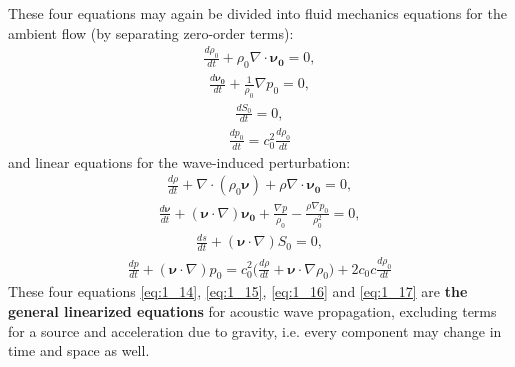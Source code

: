         These four equations may again be divided into fluid mechanics equations for the ambient flow (by separating zero-order terms):
        \begin{align} \label{eq:1_10}
            \frac{d\rho_0}{d t}+\rho_0\nabla\cdot\bm{\nu_0}=0,
        \end{align}
\vspace*{-7mm}
        \begin{align} \label{eq:1_11}
            \frac{d\bm{\nu_0}}{d t}+\frac{1}{\rho_0}\nabla p_0=0,
        \end{align}
\vspace*{-7mm}
        \begin{align} \label{eq:1_12}
            \frac{d S_0}{d t}=0,
        \end{align}
\vspace*{-7mm}
        \begin{align} \label{eq:1_13}
            \frac{d p_0}{d t}=c_0^2\frac{d \rho_0}{d t}
        \end{align}
        and linear equations for the wave-induced perturbation:
        \begin{align} \label{eq:1_14}
            \frac{d \rho}{d t} + \nabla\cdot(\rho_0 \bm{\nu})+\rho\nabla\cdot\bm{\nu_0} = 0,
        \end{align}
\vspace*{-7mm}
        \begin{align} \label{eq:1_15}
            \frac{d \bm{\nu}}{d t} + (\bm{\nu}\cdot\nabla)\bm{\nu_0} + \frac{\nabla p}{\rho_0} - \frac{\rho\nabla p_0}{\rho_0^2}=0,
        \end{align}
\vspace*{-7mm}
        \begin{align} \label{eq:1_16}
            \frac{d s}{d t}+(\bm{\nu}\cdot\nabla)S_0=0,
        \end{align}
\vspace*{-7mm}
        \begin{align} \label{eq:1_17}
            \frac{d p}{d t}+(\bm{\nu}\cdot\nabla)p_0 = c_0^2 \biggl( \frac{d \rho}{d t} + \bm{\nu}\cdot\nabla\rho_0 \biggr) + 2c_0 c \frac{d \rho_0}{d t}
        \end{align}
        These four equations \ref{eq:1_14}, \ref{eq:1_15}, \ref{eq:1_16} and \ref{eq:1_17} are \textbf{the general linearized equations} for acoustic wave
propagation, excluding terms for a source and acceleration due to gravity, i.e. every component may change in time and space as well.


